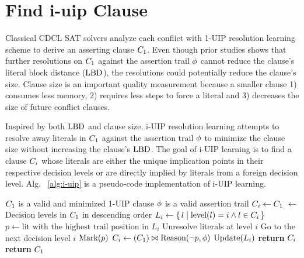 \section{Find i-uip Clause}
Classical CDCL SAT solvers analyze each conflict with 1-UIP resolution learning scheme to derive an asserting clause $C_{1}$. Even though prior studies shows that further resolutions on $C_{1}$ against the assertion trail $\phi$ cannot reduce the clause's literal block distance ($\text{LBD}$), the resolutions could potentially reduce the clause's size. Clause size is an important quality measurement because a smaller clause 1) consumes less memory, 2) requires less steps to force a literal and 3) decreases the size of future conflict clauses.

Inspired by both $\text{LBD}$ and clause size, i-UIP resolution learning attempts to resolve away literals in $C_{1}$ against the assertion trail $\phi$ to minimize the clause size without increasing the clause's $\text{LBD}$. The goal of i-UIP learning is to find a clause $C_{i}$ whose literals are either the unique implication points in their respective decision levels or are directly implied by literals from a foreign decision level. Alg. ~\ref{alg:i-uip} is a pseudo-code implementation of i-UIP learning. 


\begin{algorithm}[t]
\caption{\IUIP}\label{alg:i-uip}
\begin{algorithmic}[1]
\Require  $C_{1}$ is a valid and minimized 1-UIP clause
\Require  $\phi$ is a valid assertion trail
\Procedure{\IUIP}{$\oneUIPClause, \assertionTrail$} 
    \State $C_{i} \gets C_{1} $  \label{ln:init}
    \State {} $\gets$ Decision levels in $C_{1}$ in descending order
 \label{ln:iterDecisionLvls}
    \State $L_{i} \gets \{\,l\mid\text{level}(l) = i \wedge l \in C_{i}\,\}$
     \label{ln:uip}
        \State $p \gets \text{lit with the highest trail position in } L_{i} $ \label{ln:trailaccess}
         \label{ln:resolvable}
            \If{$\IUIPPURE$}
                \State Unresolve literals at level $i$  \label{ln:unresolve}
                \State Go to the next decision level $i$ \label{ln:abondon}
            \ElsIf{$\IUIPMIN$}
                \State $\text{Mark}(p)$ \label{ln:mark}
            \EndIf
        \Else 
            \State  $C_{i} \gets (C_{1} ) \bowtie \text{Reason}(\neg{p}, \phi)$
           \State  $\text{Update}(L_{i})$
        \EndIf
    \EndWhile
\EndFor \label{ln:endCompleteResolution}
\If{$|\iUIPClause| < |\oneUIPClause|$} \label{ln:checkSize}
    \State \textbf{return} $C_{i}$
\Else
    \State \textbf{return} $C_{1}$
\EndIf  \label{ln:cSizeCheck}
\EndProcedure
\end{algorithmic}
\end{algorithm}

